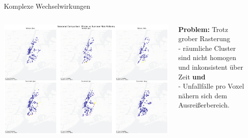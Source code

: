 \documentclass[aspectratio=169,xcolor={usenames,dvipsnames,svgnames,table},10pt,usepdftitle=false,hyperref={bookmarksdepth=3}]{beamer}
\makeatletter
\renewenvironment{figure}[1][]{%
  \def\@captype{figure}%
  \par\centering}
  {\par}
\makeatother
\begin{document}

\begin{frame}{Komplexe Wechselwirkungen}
    \vspace{0.2cm}
    \begin{columns}
        \begin{column}{0.6\textwidth}
            \begin{figure}
                \centering
                \includegraphics[width=\textwidth]{../results/cellx800m_celly800m_cellt6h/plots/seasonal_risk_comparison_800.0m_800.0m_6.0h.png}
                \caption{Saisonale Risikomuster unterscheiden sich räumlich}
            \end{figure}
        \end{column}

        \begin{column}{0.4\textwidth}
            \textbf{Problem:} Trotz grober Rasterung \\
            - räumliche Cluster sind nicht homogen und inkonsistent über Zeit \textbf{und} \\
            - Unfallfälle pro Voxel nähern sich dem Ausreißerbereich.
        \end{column}
    \end{columns}
\end{frame}
\end{document}
